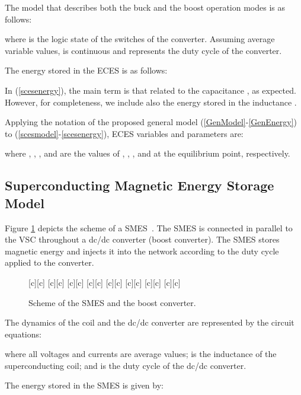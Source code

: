 \documentclass[journal, a4paper]{IEEEtran}
\begin{document}
The model that describes both the buck and the boost operation modes
is as follows:

where  is the logic state of the switches of the converter. Assu\-ming
average variable values,  is continuous and 
re\-presents the duty cycle of the converter. 

The energy stored in the ECES is as follows: 


In (\ref{scesenergy}), the main term is that related to the
capacitance , as expected.  However, for completeness, we
include also the energy stored in the inductance .

Applying the notation of the proposed general model (\ref{GenModel}-\ref{GenEnergy})
to (\ref{scesmodel}-\ref{scesenergy}), ECES variables and
parameters are:

where , , ,  and
 are the values of , , ,
 and  at the equilibrium point, respectively.

\subsection{Superconducting Magnetic Energy Storage Model}
\label{subsec:smes}
Figure \ref{fig:SMES} depicts the scheme of a 
SMES~\cite{IEEEtaskforce:06}.  The SMES is connected
in parallel to the VSC throughout a dc/dc converter (boost converter).
The SMES stores magnetic energy and injects it into the network
according to the duty cycle applied to the converter.

\begin{figure}[htb]
  \begin{center}
   [c][c]{\Huge }
    [c][c]{\Huge }
    [c][c]{\Huge }
    [c][c]{\Huge }
    [c][c]{\Huge }
    [c][c]{\Huge }
    \psfrag{+}[c][c]{\LARGE }
    \psfrag{-}[c][c]{\LARGE }
\caption{Scheme of the SMES and the boost converter.}
    \label{fig:SMES}
  \end{center}
\vspace{-0.4cm}
\end{figure}

The dynamics of the coil and the dc/dc converter are represented by
the circuit equations:

where all voltages and currents are average values;  is the
inductance of the superconducting coil; and  is the duty cycle of
the dc/dc converter.

The energy stored in the SMES is given by:
\end{document}
